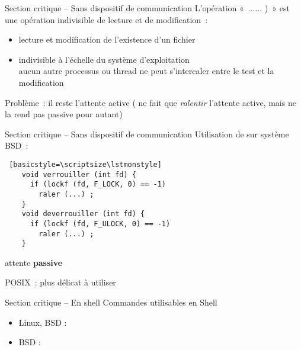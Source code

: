\begin {frame} {Section critique -- Sans dispositif de communication}
    L'opération «~......\code
    {)}~» est une opération indivisible de lecture et de modification~:

    \begin {itemize}
	\item lecture et modification de l'existence d'un fichier
	\item indivisible à l'échelle du système d'exploitation \\
	    \implique aucun autre processus ou thread ne peut s'intercaler
	    entre le test et la modification

    \end {itemize}

    Problème~: il reste l'attente active
    ( ne fait que \emph {ralentir} l'attente active, mais ne
    la rend pas passive pour autant)

\end {frame}

\begin {frame} [fragile] {Section critique -- Sans dispositif de communication}
    Utilisation de  sur système BSD~:

    \begin {lstlisting} [basicstyle=\scriptsize\lstmonstyle]
    void verrouiller (int fd) {
      if (lockf (fd, F_LOCK, 0) == -1)
        raler (...) ;
    }
    void deverrouiller (int fd) {
      if (lockf (fd, F_ULOCK, 0) == -1)
        raler (...) ;
    }
    \end{lstlisting}

    \implique attente \textbf {passive}

    \vspace* {3mm}

    POSIX~:  plus délicat à utiliser
\end{frame}


\begin {frame} {Section critique -- En shell}
    Commandes utilisables en Shell
    \begin {itemize}
	\item Linux, BSD :


	\item BSD :

    \end {itemize}

\end {frame}

